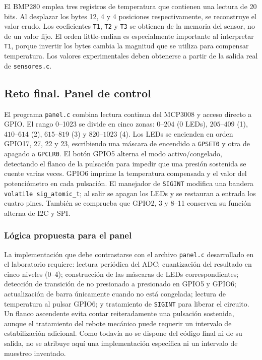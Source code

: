 \documentclass[conference]{IEEEtran}
\begin{document}
El BMP280 emplea tres registros de temperatura que contienen una lectura de 20 bits. Al desplazar los bytes 12, 4 y 4 posiciones respectivamente, se reconstruye el valor crudo. Los coeficientes \texttt{T1}, \texttt{T2} y \texttt{T3} se obtienen de la memoria del sensor, no de un valor fijo. El orden little-endian es especialmente importante al interpretar \texttt{T1}, porque invertir los bytes cambia la magnitud que se utiliza para compensar temperatura. Los valores experimentales deben obtenerse a partir de la salida real de \texttt{sensores.c}.
\subsection{Reto final. Panel de control}
El programa \texttt{panel.c} combina lectura continua del MCP3008 y acceso directo a GPIO. El rango 0--1023 se divide en cinco zonas: $0$--$204$ (0 LEDs), $205$--$409$ (1), $410$--$614$ (2), $615$--$819$ (3) y $820$--$1023$ (4). Los LEDs se encienden en orden GPIO17, 27, 22 y 23, escribiendo una máscara de encendido a \texttt{GPSET0} y otra de apagado a \texttt{GPCLR0}. El botón GPIO5 alterna el modo activo/congelado, detectando el flanco de la pulsación para impedir que una presión sostenida se cuente varias veces. GPIO6 imprime la temperatura compensada y el valor del potenciómetro en cada pulsación. El manejador de \texttt{SIGINT} modifica una bandera \texttt{volatile sig\_atomic\_t}; al salir se apagan los LEDs y se restauran a entrada los cuatro pines. También se comprueba que GPIO2, 3 y 8--11 conserven su función alterna de I2C y SPI.
\subsubsection{Lógica propuesta para el panel}
La implementación que debe contrastarse con el archivo \texttt{panel.c} desarrollado en el laboratorio requiere: lectura periódica del ADC; cuantización del resultado en cinco niveles (0--4); construcción de las máscaras de LEDs correspondientes; detección de transición de no presionado a presionado en GPIO5 y GPIO6; actualización de barra únicamente cuando no está congelada; lectura de temperatura al pulsar GPIO6; y tratamiento de \texttt{SIGINT} para liberar el circuito. Un flanco ascendente evita contar reiteradamente una pulsación sostenida, aunque el tratamiento del rebote mecánico puede requerir un intervalo de estabilización adicional. Como todavía no se dispone del código final ni de su salida, no se atribuye aquí una implementación específica ni un intervalo de muestreo inventado.
\end{document}
